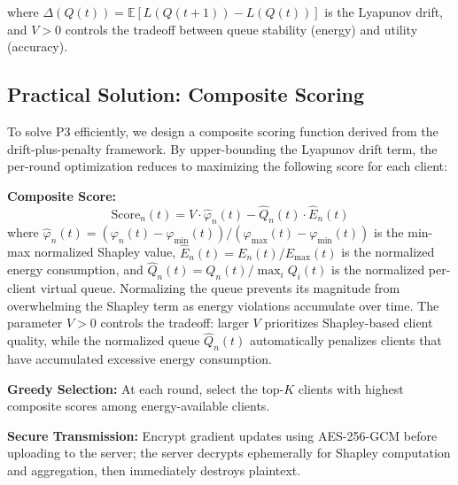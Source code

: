 where $\Delta(Q(t)) = \mathbb{E}[L(Q(t+1)) - L(Q(t))]$ is the Lyapunov drift, and $V > 0$ controls the tradeoff between queue stability (energy) and utility (accuracy).

\subsection{Practical Solution: Composite Scoring}

To solve P3 efficiently, we design a composite scoring function derived from the drift-plus-penalty framework. By upper-bounding the Lyapunov drift term, the per-round optimization reduces to maximizing the following score for each client:

\textbf{Composite Score:}
\begin{equation}
\text{Score}_n(t) = V \cdot \hat{\varphi}_n(t) - \hat{Q}_n(t) \cdot \hat{E}_n(t)
\end{equation}
where $\hat{\varphi}_n(t) = (\varphi_n(t) - \varphi_{\min}(t)) / (\varphi_{\max}(t) - \varphi_{\min}(t))$ is the min-max normalized Shapley value, $\hat{E}_n(t) = E_n(t) / E_{\max}(t)$ is the normalized energy consumption, and $\hat{Q}_n(t) = Q_n(t) / \max_{i} Q_i(t)$ is the normalized per-client virtual queue. Normalizing the queue prevents its magnitude from overwhelming the Shapley term as energy violations accumulate over time. The parameter $V > 0$ controls the tradeoff: larger $V$ prioritizes Shapley-based client quality, while the normalized queue $\hat{Q}_n(t)$ automatically penalizes clients that have accumulated excessive energy consumption.

\textbf{Greedy Selection:} At each round, select the top-$K$ clients with highest composite scores among energy-available clients.

\textbf{Secure Transmission:} Encrypt gradient updates using AES-256-GCM before uploading to the server; the server decrypts ephemerally for Shapley computation and aggregation, then immediately destroys plaintext.

